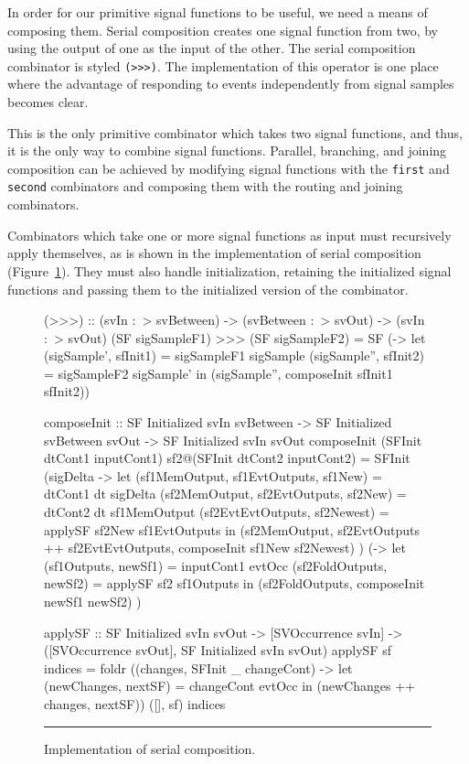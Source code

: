 In order for our primitive signal functions to be useful, we need a means of
composing them. Serial composition creates one signal function from two, by
using the output of one as the input of the other. The serial composition
combinator is styled {\tt (>>>)}. The implementation of this operator is one
place where the advantage of responding to events independently from signal
samples becomes clear. 

This is the only primitive combinator which takes two signal functions, and
thus, it is the only way to combine signal functions. Parallel, branching, and
joining composition can be achieved by modifying signal functions with the
{\tt first} and {\tt second} combinators and composing them with the
routing and joining combinators.

Combinators which take one or more signal functions as input must recursively
apply themselves, as is shown in the implementation of serial composition
(Figure~\ref{figure:serial_composition_implementation}). They must also
handle initialization, retaining the initialized signal functions and passing
them to the initialized version of the combinator.

\begin{figure}
\begin{code}
(>>>) ::    (svIn :~> svBetween) 
         -> (svBetween :~> svOut)
         -> (svIn :~> svOut)
(SF sigSampleF1) >>> (SF sigSampleF2) =
  SF (\sigSample -> let (sigSample', sfInit1) = sigSampleF1 sigSample
                        (sigSample'', sfInit2) = sigSampleF2 sigSample'
                    in (sigSample'', composeInit sfInit1 sfInit2))

composeInit ::     SF Initialized svIn svBetween
                -> SF Initialized svBetween svOut
                -> SF Initialized svIn svOut
composeInit (SFInit dtCont1 inputCont1) sf2@(SFInit dtCont2 inputCont2) =
  SFInit
    (\dt sigDelta -> 
       let (sf1MemOutput, sf1EvtOutputs, sf1New) = dtCont1 dt sigDelta
           (sf2MemOutput, sf2EvtOutputs, sf2New) = dtCont2 dt sf1MemOutput
           (sf2EvtEvtOutputs, sf2Newest) = applySF sf2New sf1EvtOutputs
       in (sf2MemOutput,
           sf2EvtOutputs ++ sf2EvtEvtOutputs,
           composeInit sf1New sf2Newest)
    )
    (\evtOcc -> 
      let (sf1Outputs, newSf1) = inputCont1 evtOcc
          (sf2FoldOutputs, newSf2) = applySF sf2 sf1Outputs
      in (sf2FoldOutputs, composeInit newSf1 newSf2)   
    )

applySF ::    SF Initialized svIn svOut
           -> [SVOccurrence svIn]
           -> ([SVOccurrence svOut],
               SF Initialized svIn svOut)
applySF sf indices =
  foldr (\evtOcc (changes, SFInit _ changeCont) ->
           let (newChanges, nextSF) = changeCont evtOcc
               in (newChanges ++ changes, nextSF))
        ([], sf)
        indices
\end{code}
\hrule
\caption{Implementation of serial composition.}
\label{figure:serial_composition_implementation}
\end{figure}

